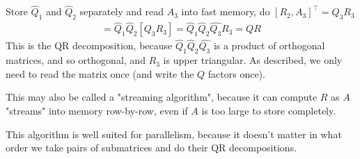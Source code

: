 \documentclass[11pt]{article}
\numberwithin{equation}{section}
\begin{document}
Store $\hat{Q}_1$ and $\hat{Q}_{2}$ separately and read $A_3$ into fast memory, do $[R_2,A_3]^\top = Q_3 R_3$
\begin{align*}
    = \hat{Q}_1 \hat{Q}_{2}[Q_3 R_3] = \hat{Q}_1 \hat{Q}_{2}\hat{Q_3} R_3 = QR
\end{align*}
This is the QR decomposition, because $\hat{Q}_1 \hat{Q}_{2}\hat{Q_3}$ is a product of orthogonal matrices, and so orthogonal, 
and $R_3$ is upper triangular. As described, we only need to read the matrix once (and write the $Q$ factors once).

This may also be called a "streaming algorithm", because it can compute $R$ as $A$ "streams" into memory row-by-row, even if $A$ is too large to store completely.

This algorithm is well suited for parallelism, because it doesn't matter in what order we take pairs of submatrices and do their QR decompositions. 
\end{document}

